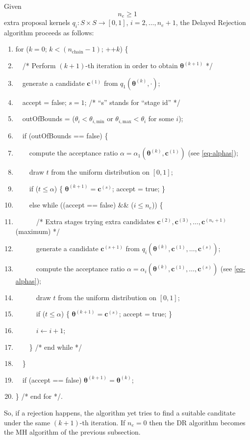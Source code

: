 Given
\begin{equation}\label{eq-ne}
n_e\geqslant 1
\end{equation}
extra proposal kernels $q_i:S\times S\rightarrow [0,1]$, $i=2,\ldots,n_e+1$,
the Delayed Rejection algorithm proceeds as follows:
\begin{enumerate}
\item for ($k=0$; $k < (n_{\text{chain}}-1)$; ++$k$) \{
\item $\quad$/* Perform $(k+1)$-th iteration in order to obtain $\boldsymbol{\theta}^{(k+1)}$ */
\item $\quad$generate a candidate $\mathbf{c}^{(1)}$ from $q_1(\boldsymbol{\theta}^{(k)},\cdot)$;
\item $\quad$accept = false; $s=1$; /* ``s'' stands for ``stage id'' */
\item $\quad$outOfBounds = ($\theta_i < \theta_{i,\text{min}}$ or $\theta_{i,\text{max}} < \theta_i$ for some $i$);
\item $\quad$if (outOfBounds == false) \{
\item $\quad\quad$compute the acceptance ratio $\alpha=\alpha_1(\boldsymbol{\theta}^{(k)},\mathbf{c}^{(1)})$ (see \eqref{eq-alphas});
\item $\quad\quad$draw $t$ from the uniform distribution on $[0,1]$;
\item $\quad\quad$if ($t\leqslant \alpha$) \{ $\boldsymbol{\theta}^{(k+1)}=\mathbf{c}^{(s)}$; accept = true; \}
\item $\quad\quad$else while ((accept == false) \&\& ($i\leqslant n_e$)) \{
\item $\quad\quad\quad$/* Extra stages trying extra candidates $\mathbf{c}^{(2)},\mathbf{c}^{(3)},\ldots,\mathbf{c}^{(n_e+1)}$ (maximum) */
\item $\quad\quad\quad$generate a candidate $\mathbf{c}^{(s+1)}$ from $q_i(\boldsymbol{\theta}^{(k)},\mathbf{c}^{(1)},\ldots,\mathbf{c}^{(s)})$;
\item $\quad\quad\quad$compute the acceptance ratio $\alpha=\alpha_i(\boldsymbol{\theta}^{(k)},\mathbf{c}^{(1)},\ldots,\mathbf{c}^{(s)})$ (see \eqref{eq-alphas});
\item $\quad\quad\quad$draw $t$ from the uniform distribution on $[0,1]$;
\item $\quad\quad\quad$if ($t\leqslant \alpha$) \{ $\boldsymbol{\theta}^{(k+1)}=\mathbf{c}^{(s)}$; accept = true; \}
\item $\quad\quad\quad$$i\leftarrow i+1$;
\item $\quad\quad$\} /* end while */
\item $\quad$\}
\item $\quad$if (accept == false) $\boldsymbol{\theta}^{(k+1)}=\boldsymbol{\theta}^{(k)}$;
\item \} /* end for */.
\end{enumerate}
So, if a rejection happens, the algorithm yet tries to find a suitable canditate under the same $(k+1)$-th iteration.
If $n_e=0$ then the DR algorithm becomes the MH algorithm of the previous subsection.


